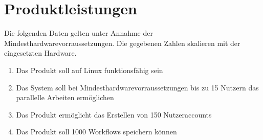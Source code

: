 \chapter{Produktleistungen}
Die folgenden Daten gelten unter Annahme der Mindesthardwarevorraussetzungen. Die
gegebenen Zahlen skalieren mit der eingesetzten Hardware.

\renewcommand{\labelenumi}{/PL\arabic{enumi}0/}
\begin{enumerate}
    \setlength\itemsep{-1em}
    \item Das Produkt soll auf Linux funktionsfähig sein
    \item Das System soll bei Mindesthardwarevorraussetzungen bis zu 15 Nutzern das parallelle Arbeiten ermöglichen
    \item Das Produkt ermöglicht das Erstellen von 150 Nutzeraccounts
    \item Das Produkt soll 1000 Workflows speichern können
    
\end{enumerate}